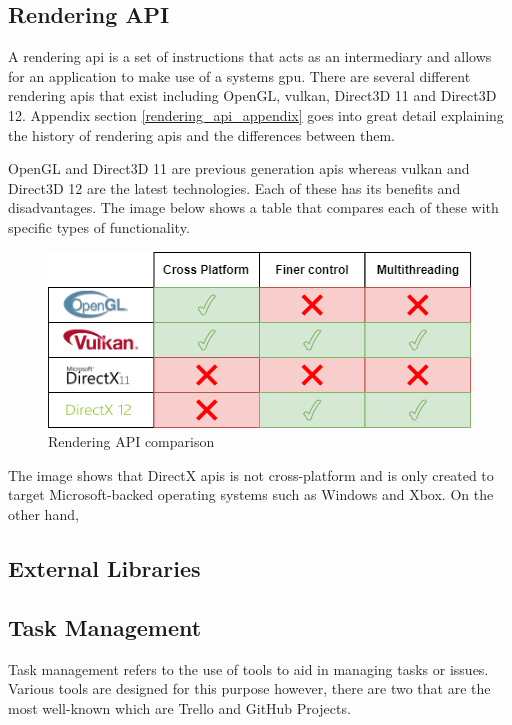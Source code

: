 \documentclass[11pt]{article}
\begin{document}
\subsection{Rendering API} \label{rendering_api_tech_review}
A rendering \gls*{api} is a set of instructions that acts as an intermediary and
allows for an application to make use of a systems \gls*{gpu}. There are several
different rendering \glspl*{api} that exist including OpenGL, \gls*{vulkan},
Direct3D 11 and Direct3D 12. Appendix section \ref{rendering_api_appendix} goes
into great detail explaining the history of rendering \glspl*{api} and the
differences between them.

OpenGL and Direct3D 11 are previous generation \glspl*{api} whereas
\gls*{vulkan} and Direct3D 12 are the latest technologies. Each of these has its
benefits and disadvantages. The image below shows a table that compares each of
these with specific types of functionality. 
\begin{figure}[H]
  \centering
  \includegraphics[width=\textwidth]{images/api_comparison.png}
  \caption{Rendering API comparison}
  \label{fig:api_comparison}
\end{figure}


The image shows that DirectX \glspl*{api} is not cross-platform and is only
created to target Microsoft-backed operating systems such as Windows and Xbox.
On the other hand,



\subsection{External Libraries}




\subsection{Task Management}
Task management refers to the use of tools to aid in managing tasks or issues.
Various tools are designed for this purpose however, there are two that are the most
well-known which are Trello and GitHub Projects.
\end{document}
